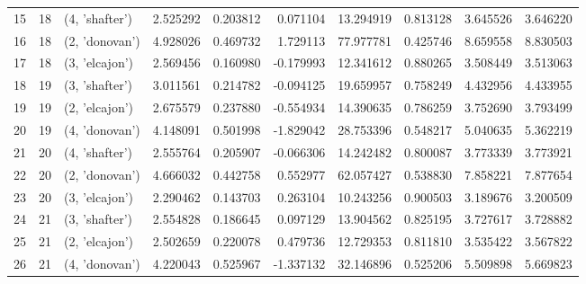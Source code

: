 \begin{tabular}{lrlrrrrrrr}
15 &     18 &  (4, 'shafter') &  2.525292 &   0.203812 &  0.071104 &  13.294919 &  0.813128 &   3.645526 &  3.646220 \\
16 &     18 &  (2, 'donovan') &  4.928026 &   0.469732 &  1.729113 &  77.977781 &  0.425746 &   8.659558 &  8.830503 \\
17 &     18 &  (3, 'elcajon') &  2.569456 &   0.160980 & -0.179993 &  12.341612 &  0.880265 &   3.508449 &  3.513063 \\
18 &     19 &  (3, 'shafter') &  3.011561 &   0.214782 & -0.094125 &  19.659957 &  0.758249 &   4.432956 &  4.433955 \\
19 &     19 &  (2, 'elcajon') &  2.675579 &   0.237880 & -0.554934 &  14.390635 &  0.786259 &   3.752690 &  3.793499 \\
20 &     19 &  (4, 'donovan') &  4.148091 &   0.501998 & -1.829042 &  28.753396 &  0.548217 &   5.040635 &  5.362219 \\
21 &     20 &  (4, 'shafter') &  2.555764 &   0.205907 & -0.066306 &  14.242482 &  0.800087 &   3.773339 &  3.773921 \\
22 &     20 &  (2, 'donovan') &  4.666032 &   0.442758 &  0.552977 &  62.057427 &  0.538830 &   7.858221 &  7.877654 \\
23 &     20 &  (3, 'elcajon') &  2.290462 &   0.143703 &  0.263104 &  10.243256 &  0.900503 &   3.189676 &  3.200509 \\
24 &     21 &  (3, 'shafter') &  2.554828 &   0.186645 &  0.097129 &  13.904562 &  0.825195 &   3.727617 &  3.728882 \\
25 &     21 &  (2, 'elcajon') &  2.502659 &   0.220078 &  0.479736 &  12.729353 &  0.811810 &   3.535422 &  3.567822 \\
26 &     21 &  (4, 'donovan') &  4.220043 &   0.525967 & -1.337132 &  32.146896 &  0.525206 &   5.509898 &  5.669823 \\
\bottomrule
\end{tabular}
